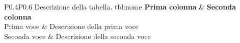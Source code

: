 \begin{tabellatesi}{P{0.4}P{0.6}}
	{Descrizione della tabella.}
	{tbl:nome}
	\toprule
	 \textbf{Prima colonna} & \textbf{Seconda colonna} \\
	\midrule
	Prima voce & Descrizione della prima voce \\
	Seconda voce & Descrizione della seconda voce \\
	\bottomrule
\end{tabellatesi}
